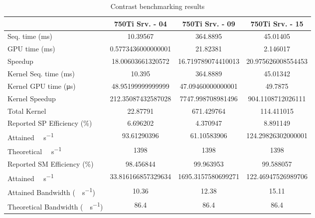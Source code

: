 \begin{table}[H]
	\centering
	\caption{Contrast benchmarking results}
	\label{tab:contrast-results}
	\begin{tabular}{lS[table-format=7.1]S[table-format=7.1]S[table-format=7.1]}
		\toprule
			~ & {\textbf{750Ti Srv. - 04}} & {\textbf{750Ti Srv. - 09}} & {\textbf{750Ti Srv. - 15}} \\
		\midrule
			{Seq. time (\si{\milli\second})} & 10.39567 & 364.8895 & 45.01405 \\
			{GPU time (\si{\milli\second})} & 0.5773436000000001 & 21.82381 & 2.146017 \\
			{Speedup} & 18.00603661320572 &16.719789074410013 & 20.975626008554453 \\
		\midrule
			{Kernel Seq. time (\si{\milli\second})} & 10.395 & 364.8889 & 45.01342 \\
			{Kernel GPU time (\si{\micro\second})} & 48.95199999999999 & 47.09460000000001 & 49.7875 \\
			{Kernel Speedup} & 212.35087432587028 & 7747.998708981496 & 904.1108712026111 \\
		\midrule
			{Total Kernel \si{\mega\flops}} & 22.87791 & 671.429764 & 114.411015 \\
			{Reported SP Efficiency (\si{\percent})} & 6.696202 & 4.370947 & 8.891149 \\
			{Attained \si{\giga\flops\per\second}} & 93.61290396 & 61.10583906 & 124.29826302000001 \\
			{Theoretical \si{\giga\flops\per\second}} & 1398 & 1398 & 1398 \\
		\midrule
			{Reported SM Efficiency (\si{\percent})} & 98.456844 & 99.963953 & 99.588057 \\
			{Attained \si{\giga\iops\per\second}} & 33.816166857329634 & 1695.3157580699271 & 122.46947526989706 \\			
		\midrule
			{Attained Bandwidth (\si{\giga\byte\per\second})} & 10.36 & 12.38  & 15.11 \\
			{Theoretical Bandwidth (\si{\giga\byte\per\second})}	& 86.4 & 86.4 & 86.4 \\
		\bottomrule
	\end{tabular}
\end{table}